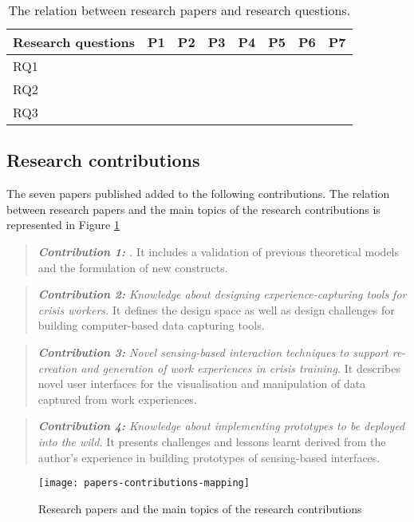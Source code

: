 \begin{table}
	[tbh] \centering \caption{The relation between research papers and research questions.} \label{tab:rq-papers-relation} 
	\begin{tabular}
		{p{}p{}ccccccc} \toprule \multicolumn{2}{l}{Research questions} & P1 & P2 & P3 & P4 & P5 & P6 & P7 \\
		\midrule RQ1 & \RQi & & \textbullet & \textbullet & & & \textbullet & \\
		RQ2 & \RQii & \textbullet & \textbullet & & \textbullet & \textbullet & \textbullet & \\
		RQ3 & \RQiii & & & \textbullet & & \textbullet & & \textbullet \\
		\bottomrule 
	\end{tabular}
\end{table}

\subsection{Research contributions}\label{research-contributions}

The seven papers published added to the following contributions. The relation between research papers and the main topics of the research contributions is represented in Figure \ref{fig:mapping}
\begin{quote}
	\emph{\textbf{Contribution 1:} \Ci.} It includes a validation of previous theoretical models and the formulation of new constructs. 
\end{quote}
\begin{quote}
	\emph{\textbf{Contribution 2:} Knowledge about designing experience-capturing tools for crisis workers.} It defines the design space as well as design challenges for building computer-based data capturing tools. 
\end{quote}
\begin{quote}
	\emph{\textbf{Contribution 3:} Novel sensing-based interaction techniques to support re-creation and generation of work experiences in crisis training.} It describes novel user interfaces for the visualisation and manipulation of data captured from work experiences. 
\end{quote}
\begin{quote}
	\emph{\textbf{Contribution 4:} Knowledge about implementing prototypes to be deployed into the wild.} It presents challenges and lessons learnt derived from the author's experience in building prototypes of sensing-based interfaces. 
\end{quote}
\begin{figure}
	[tb] \centering 
	\texttt{[image: papers-contributions-mapping]} \caption{Research papers and the main topics of the research contributions} \label{fig:mapping} 
\end{figure}

